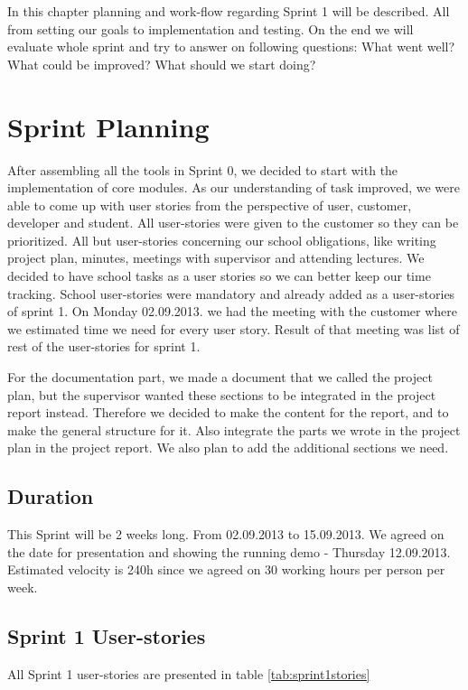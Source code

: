 In this chapter planning and work-flow regarding Sprint 1 will be described. 
All from setting our goals to implementation and testing. On the end we will evaluate whole sprint and try to answer on following questions: What went well? What could be improved? What should we start doing?  


\section{Sprint Planning}
After assembling all the tools in Sprint 0, we decided to start with the implementation of core modules.
As our understanding of task improved, we were able to come up with user stories from the perspective of user, customer, developer and student.
All user-stories were given to the customer so they can be prioritized. 
All but user-stories concerning our school obligations, like writing project plan, minutes, meetings with supervisor and attending lectures.
We decided to have school tasks as a user stories so we can better keep our time tracking. 
School user-stories were mandatory and already added as a user-stories of sprint 1.
On Monday 02.09.2013. we had the meeting with the customer where we estimated time we need for every user story.
Result of that meeting was list of rest of the user-stories for sprint 1.

For the documentation part, we made a document that we called the project plan, but the supervisor wanted these sections to be integrated in the project report instead. Therefore we decided to make the content for the report, and to make the general structure for it. Also integrate the parts we wrote in the project plan in the project report. We also plan to add the additional sections we need.

\subsection{Duration}
This Sprint will be 2 weeks long. From 02.09.2013 to 15.09.2013.
We agreed on the date for presentation and showing the running demo - Thursday 12.09.2013.
Estimated velocity is 240h since we agreed on 30 working hours per person per week.

\subsection{Sprint 1 User-stories}

All Sprint 1 user-stories are presented in table \ref{tab:sprint1stories}


